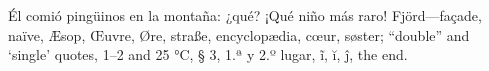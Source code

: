 \documentclass{article}
\begin{document}
Él comió pingüinos en la montaña: ¿qué? ¡Qué niño más raro! Fjörd—façade, naïve, Æsop, Œuvre, Øre, straße,
encyclopædia, cœur, søster; “double” and ‘single’ quotes, 1–2 and 25 °C, § 3, 1.ª y 2.º lugar, ĩ, ĭ, ĵ, the end.
\end{document}
